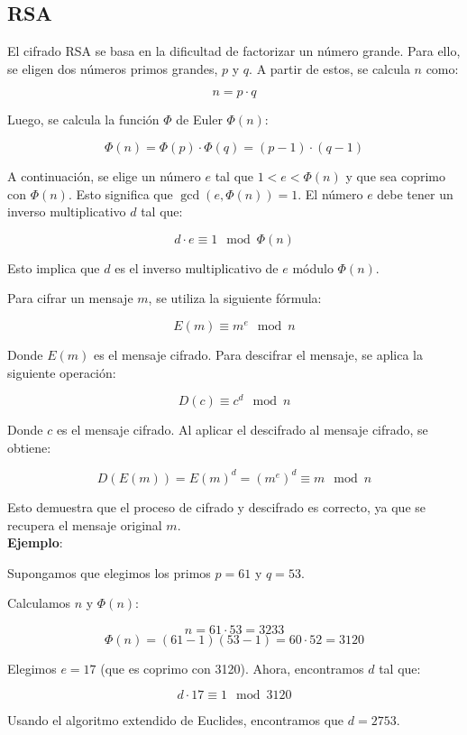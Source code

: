 \documentclass{article}
\begin{document}
\newpage

\subsection{RSA}
El cifrado RSA se basa en la dificultad de factorizar un número grande. Para ello, se eligen dos números primos grandes, $ p $ y $ q $. A partir de estos, se calcula $ n $ como:

$$n = p \cdot q$$

Luego, se calcula la función $\varPhi$ de Euler $ \varPhi(n) $:

$$\varPhi(n) = \varPhi(p) \cdot \varPhi(q) = (p-1) \cdot (q-1)$$

A continuación, se elige un número $ e $ tal que $ 1 < e < \varPhi(n) $ y que sea coprimo con $ \varPhi(n) $. Esto significa que $ \gcd(e, \varPhi(n)) = 1 $. El número $ e $ debe tener un inverso multiplicativo $ d $ tal que:

$$d \cdot e \equiv 1 \mod \varPhi(n)$$

Esto implica que $ d $ es el inverso multiplicativo de $ e $ módulo $ \varPhi(n) $.


Para cifrar un mensaje $ m $, se utiliza la siguiente fórmula:

$$E(m) \equiv m^e \mod n$$

Donde $ E(m) $ es el mensaje cifrado. Para descifrar el mensaje, se aplica la siguiente operación:

$$D(c) \equiv c^d \mod n$$

Donde $ c $ es el mensaje cifrado. Al aplicar el descifrado al mensaje cifrado, se obtiene:

$$D(E(m)) = E(m)^d = (m^e)^d \equiv m \mod n$$

Esto demuestra que el proceso de cifrado y descifrado es correcto, ya que se recupera el mensaje original $ m $. \\

\textbf{Ejemplo}:

Supongamos que elegimos los primos $ p = 61 $ y $ q = 53 $.

Calculamos $ n $ y $ \varPhi(n) $:

$$n = 61 \cdot 53 = 3233$$
$$\varPhi(n) = (61-1)(53-1) = 60 \cdot 52 = 3120$$

Elegimos $ e = 17 $ (que es coprimo con 3120). Ahora, encontramos $ d $ tal que:

$$d \cdot 17 \equiv 1 \mod 3120$$

Usando el algoritmo extendido de Euclides, encontramos que $ d = 2753 $.
\end{document}
